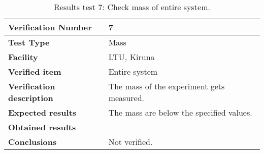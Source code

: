 \begin{table}[H]
\centering

\begin{tabular}{|m{}| m{} |}
\hline
\textbf{Verification Number} 		& 7 				\\ \hline
\textbf{Test Type} 					& Mass 	\\ \hline
\textbf{Facility} 					& LTU, Kiruna 		\\ \hline
\textbf{Verified item} 				& Entire system 	\\ \hline

\textbf{Verification description} 	& The mass of the experiment gets measured. \\ \hline

\textbf{Expected results} 			& The mass are below the specified values. \\ \hline

\textbf{Obtained results} 			& \\ \hline

\textbf{Conclusions} 				& Not verified.		\\ \hline
\end{tabular}
\caption{Results test 7: Check mass of entire system.}
\label{tab:testresult7:mass-volume}
\end{table}


\raggedbottom